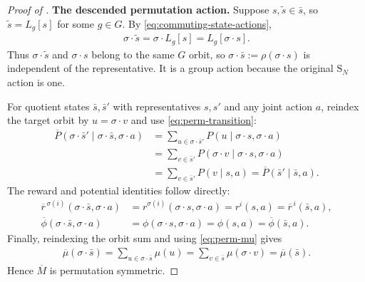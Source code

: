 \documentclass{article}
\theoremstyle{plain}
\theoremstyle{definition}
\theoremstyle{remark}
\newcommand{\quotient}[1]{\overline{#1}}
\newcommand{\Sym}{\mathrm{S}}
\begin{document}
\begin{proof}[Proof of ]
\noindent\textbf{The descended permutation action.}
Suppose $s,\widetilde s\in\bar s$, so
$\widetilde s=L_g[s]$ for some $g\in G$. By
\eqref{eq:commuting-state-actions},
\begin{align*}
  \sigma\mathbin{\cdot}\widetilde s
  =
  \sigma\mathbin{\cdot}L_g[s]
  =
  L_g[\sigma\mathbin{\cdot}s].
\end{align*}
Thus $\sigma\mathbin{\cdot}\widetilde s$ and
$\sigma\mathbin{\cdot}s$ belong to the same $G$ orbit, so
$\sigma\mathbin{\cdot}\bar s:=\rho(\sigma\mathbin{\cdot}s)$ is independent
of the representative. It is a group action because the original
$\Sym_N$ action is one.

For quotient states $\bar s,\bar s'$ with representatives $s,s'$ and any
joint action $a$, reindex the target orbit by
$u=\sigma\mathbin{\cdot}v$ and use
\eqref{eq:perm-transition}:
\begin{align*}
  \quotient P(
    \sigma\mathbin{\cdot}\bar s'
    \mid
    \sigma\mathbin{\cdot}\bar s,
    \sigma\mathbin{\cdot}a
  )
  &=
  \sum_{u\in\sigma\cdot\bar s'}
  P(u\mid\sigma\mathbin{\cdot}s,\sigma\mathbin{\cdot}a)\\
  &=
  \sum_{v\in\bar s'}
  P(\sigma\mathbin{\cdot}v
    \mid\sigma\mathbin{\cdot}s,\sigma\mathbin{\cdot}a)\\
  &=
  \sum_{v\in\bar s'}P(v\mid s,a)
  =
  \quotient P(\bar s'\mid\bar s,a).
\end{align*}
The reward and potential identities follow directly:
\begin{align*}
  \quotient r^{\,\sigma(i)}
  (\sigma\mathbin{\cdot}\bar s,\sigma\mathbin{\cdot}a)
  &=
  r^{\sigma(i)}(\sigma\mathbin{\cdot}s,\sigma\mathbin{\cdot}a)
  =
  r^i(s,a)
  =
  \quotient r^{\,i}(\bar s,a),\\
  \quotient\phi
  (\sigma\mathbin{\cdot}\bar s,\sigma\mathbin{\cdot}a)
  &=
  \phi(\sigma\mathbin{\cdot}s,\sigma\mathbin{\cdot}a)
  =
  \phi(s,a)
  =
  \quotient\phi(\bar s,a).
\end{align*}
Finally, reindexing the orbit sum and using \eqref{eq:perm-mu} gives
\begin{align*}
  \quotient\mu(\sigma\mathbin{\cdot}\bar s)
  =
  \sum_{u\in\sigma\cdot\bar s}\mu(u)
  =
  \sum_{v\in\bar s}\mu(\sigma\mathbin{\cdot}v)
  =
  \quotient\mu(\bar s).
\end{align*}
Hence $\quotient M$ is permutation symmetric.


\end{proof}
\end{document}
